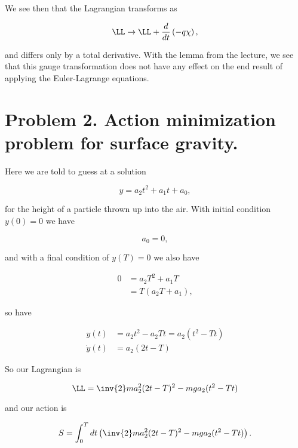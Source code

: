 We see then that the Lagrangian transforms as

\begin{equation}\label{eqn:classicalMechanicsPs1:n}
\LL \rightarrow \LL + \frac{d}{dt}\left( -q \chi \right),
\end{equation}

and differs only by a total derivative.  With the lemma from the lecture, we see that this gauge transformation does not have any effect on the end result of applying the Euler-Lagrange equations.

\section{Problem 2.  Action minimization problem for surface gravity.}

Here we are told to guess at a solution

\begin{equation}\label{eqn:classicalMechanicsPs1:n}
y = a_2 t^2 + a_1 t + a_0,
\end{equation}

for the height of a particle thrown up into the air.  With initial condition $y(0) = 0$ we have

\begin{equation}\label{eqn:classicalMechanicsPs1:n}
a_0 = 0,
\end{equation}

and with a final condition of $y(T) = 0$ we also have

\begin{align*}
0 
&= 
a_2 T^2 + a_1 T \\
&= T( a_2 T + a_1 ),
\end{align*}

so have

\begin{align}\label{eqn:classicalMechanicsPs1:n}
y(t) &= a_2 t^2 - a_2 T t = a_2 (t^2 - T t) \\
\dot{y}(t) &= 
a_2 (2 t - T )
\end{align}

So our Lagrangian is 

\begin{equation}\label{eqn:classicalMechanicsPs1:n}
\LL = 
\inv{2} m a_2^2 (2 t - T )^2 - m g a_2 (t^2 - T t)
\end{equation}

and our action is

\begin{equation}\label{eqn:classicalMechanicsPs1:n}
S = \int_0^T dt 
\left( 
\inv{2} m a_2^2 (2 t - T )^2 - m g a_2 (t^2 - T t)
\right).
\end{equation}

